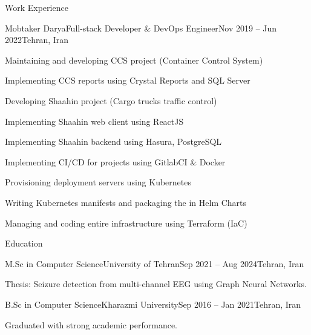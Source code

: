 \documentclass[]{main}
\begin{document}
\begin{section}{Work Experience}
 \begin{subsection}{Mobtaker Darya}{Full-stack Developer \& DevOps Engineer}{Nov 2019 -- Jun 2022}{Tehran, Iran}
     \item Maintaining and developing CCS project (Container Control System)
     \item Implementing CCS reports using Crystal Reports and SQL Server
     \item Developing Shaahin project (Cargo trucks traffic control)
     \item Implementing Shaahin web client using ReactJS
     \item Implementing Shaahin backend using Hasura, PostgreSQL
     \item Implementing CI/CD for projects using GitlabCI \& Docker
     \item Provisioning deployment servers using Kubernetes
     \item Writing Kubernetes manifests and packaging the in Helm Charts
     \item Managing and coding entire infrastructure using Terraform (IaC)
 \end{subsection}
\end{section}

\begin{section}{Education}
 \begin{subsectionnobullet}{M.Sc in Computer Science}{University of Tehran}{Sep 2021 -- Aug 2024}{Tehran, Iran}
     \item Thesis: Seizure detection from multi-channel EEG using Graph Neural Networks.
 \end{subsectionnobullet}
 \begin{subsectionnobullet}{B.Sc in Computer Science}{Kharazmi University}{Sep 2016 -- Jan 2021}{Tehran, Iran}
     \item Graduated with strong academic performance.
 \end{subsectionnobullet}
\end{section}


\end{document}
